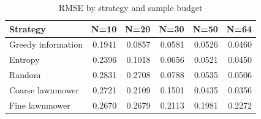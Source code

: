 \begin{table}
\caption{RMSE by strategy and sample budget}
\label{tab:rmse_by_budget}
\begin{tabular}{lrrrrr}
\toprule
Strategy & N=10 & N=20 & N=30 & N=50 & N=64 \\
\midrule
Greedy information & 0.1941 & 0.0857 & 0.0581 & 0.0526 & 0.0460 \\
Entropy & 0.2396 & 0.1018 & 0.0656 & 0.0521 & 0.0450 \\
Random & 0.2831 & 0.2708 & 0.0788 & 0.0535 & 0.0506 \\
Coarse lawnmower & 0.2721 & 0.2109 & 0.1501 & 0.0435 & 0.0356 \\
Fine lawnmower & 0.2670 & 0.2679 & 0.2113 & 0.1981 & 0.2272 \\
\bottomrule
\end{tabular}
\end{table}
